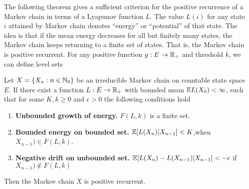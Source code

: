 \documentclass[a4paper,10pt,english]{article}
\begin{document}
The following theorem gives a sufficient criterion for the positive recurrence of a Markov chain in terms of a Lyapunov function $L$. 
The value $L(i)$ for any state $i$ attained by Markov chain denotes ``energy'' or ``potential'' of that state. 
The idea is that if the mean energy decreases for all but finitely many states, the Markov chain keeps returning to a finite set of states. 
That is, the Markov chain is positive recurrent. 
For any positive function $g: E \to \mathbb{R}_+$ and threshold $k$, we can define level sets 
\begin{thm}[F. G. Foster,1950]
Let $X = \{X_n: n \in \mathbb{N}_0\}$ be an irreducible Markov chain on countable state space $E$. 
If there exist a function $L : E \to \mathbb{R}_+$ with bounded mean $\mathbb{E} L(X_0) < \infty$, 
such that for some $K, k \geq 0$ and $\epsilon>0$ the following conditions hold
\begin{enumerate}[i\_]
\item \textbf{Unbounded growth of energy.} $F(L,k)$ is a finite set.
\item \textbf{Bounded energy on bounded set.} $\mathbb{E}[L(X_n)|X_{n-1}] < K$,when $X_{n-1}) \in F(L,k)$.
\item \textbf{Negative drift on unbounded set.} $\mathbb{E}[L(X_n)-L(X_{n-1})|X_{n-1}] < -\epsilon$ if $X_{n-1})\notin F(L,k)$
\end{enumerate}
Then the Markov chain $X$ is positive recurrent. 
\end{thm}
\end{document}
